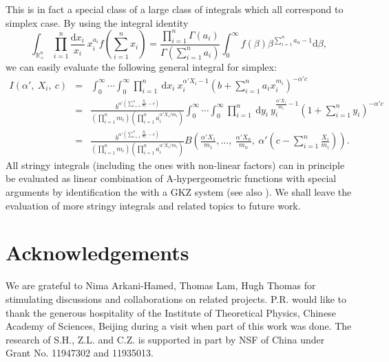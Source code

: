 \documentclass[hidelinks,12pt]{article}
\newcommand{\bea}[1]{\begin{eqnarray}\label{#1} }
\newcommand{\eea}{\end{eqnarray}}
\def\bea{\begin{eqnarray}}
\def\eea{\end{eqnarray}}
\begin{document}
This is in fact a special class of a large class of integrals which all correspond to simplex case. By using the integral identity 
\[\int_{{\mathbb R_{+}^{n}}} \prod_{i=1}^{n} \frac{\mathrm{d} x_i }{x_i}~x_i^{a_i}  f\left(\sum_{i=1}^{n} x_i \right)   = \frac{\prod_{i=1}^n \Gamma{(a_i)}}{\Gamma{(\sum_{i=1}^n a_i)}} \int_{0}^{\infty} f(\beta) \beta^{\sum_{i=1}^{n} a_n -1} \mathrm{d}\beta,
\]
we can easily evaluate the following general integral for simplex:
\bea
I(\alpha',~X_i,~c ) &=&  \int_{0}^{\infty} \cdots \int_{0}^{\infty} \prod_{i=1}^{n} ~\mathrm{d}x_i ~x_i^{\alpha' X_i -1}  \left( b+\sum_{i=1}^n a_i x_i^{m_i} \right)^{-\alpha' c } \nonumber  \\
&=& \frac{b^{\alpha' \left(\sum_{i=1}^n \frac{X_i}{m_i}-c \right) }}{(\prod_{i=1}^n m_i) (\prod_{i=1}^n a_i^{\alpha' X_i /m_i})} \int_{0}^{\infty} \cdots \int_{0}^{\infty} \prod_{i=1}^{n} ~\mathrm{d}y_i ~y_i^{ \frac{\alpha' X_i}{m_i} -1}  \left( 1+\sum_{i=1}^n y_i \right)^{-\alpha' c } \nonumber  \\
&=&\frac{b^{\alpha' \left(\sum_{i=1}^n \frac{X_i}{m_i}-c \right) }}{(\prod_{i=1}^n m_i) (\prod_{i=1}^n a_i^{\alpha' X_i /m_i})} B\left(\frac{ \alpha' X_1}{m_1},\dots,~\frac{ \alpha' X_n}{m_n}, ~ \alpha' \left(c- \sum_{i=1}^n \frac{X_i}{m_i} \right) \right). \nonumber \eea
All stringy integrals (including the ones with non-linear factors) can in principle be evaluated as linear combination of A-hypergeometric functions with special arguments by identification the with a GKZ system \cite{saito2013grobner,gelfand1990generalized} (see also \cite{delaCruz:2019skx}). We shall leave the evaluation of more stringy integrals and related topics to future work.


\section*{Acknowledgements}
We are grateful to Nima Arkani-Hamed, Thomas Lam, Hugh Thomas for stimulating discussions and collaborations on related projects. P.R. would like to thank the generous hospitality of the Institute of Theoretical Physics, Chinese Academy of Sciences, Beijing during a visit when part of this work was done. The research of S.H., Z.L. and C.Z. is supported in part by NSF of China under Grant No. 11947302 and 11935013. 
\end{document}
